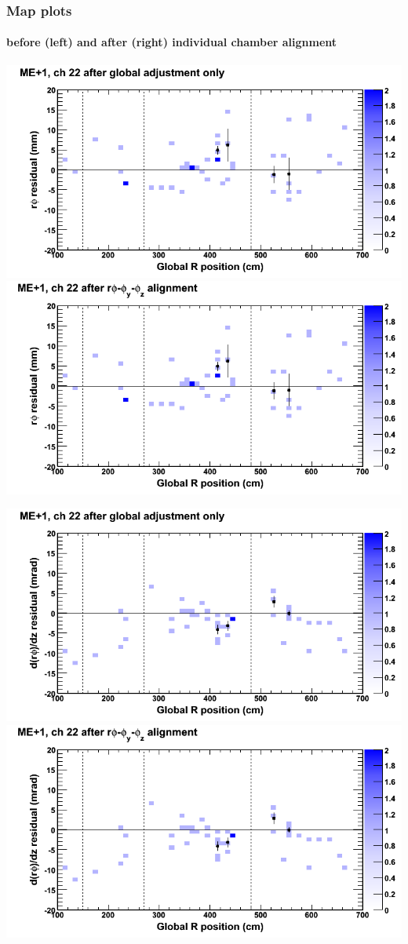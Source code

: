 \documentclass[compress]{beamer}
\begin{document}
\begin{frame}
\frametitle{Map plots}
\framesubtitle{before (left) and after (right) individual chamber alignment}
\includegraphics[width=0.5\linewidth]{ringmapplots_3dof/before_CSCvsr_mep1ch22_x.png} \includegraphics[width=0.5\linewidth]{ringmapplots_3dof/after_CSCvsr_mep1ch22_x.png}

\includegraphics[width=0.5\linewidth]{ringmapplots_3dof/before_CSCvsr_mep1ch22_dxdz.png} \includegraphics[width=0.5\linewidth]{ringmapplots_3dof/after_CSCvsr_mep1ch22_dxdz.png}
\end{frame}
\end{document}

